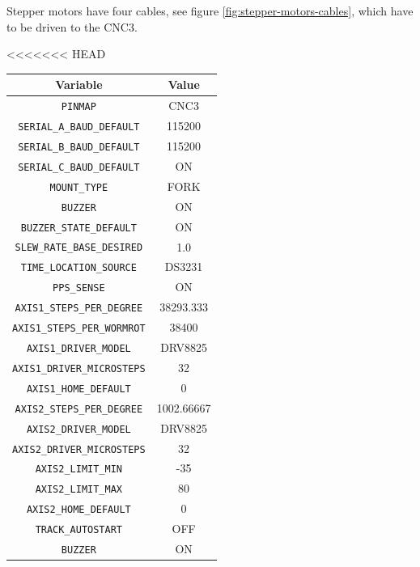 \documentclass{article}
\begin{document}
\begin{multicols}{2}
        Stepper motors have four cables, see figure \ref{fig:stepper-motors-cables}, which have to be driven to the CNC3.
        \\
        \begin{minipage}
            {0.5\textwidth}
            \centering
<<<<<<< HEAD
            \begin{tabular}{cc}
                Variable & Value \\
                \hline
                \texttt{PINMAP} & CNC3\\
                \texttt{SERIAL\_A\_BAUD\_DEFAULT} & 115200 \\
                \texttt{SERIAL\_B\_BAUD\_DEFAULT} & 115200 \\
                \texttt{SERIAL\_C\_BAUD\_DEFAULT} &  ON \\
                \texttt{MOUNT\_TYPE} & FORK \\
                \texttt{BUZZER} & ON\\
                \texttt{BUZZER\_STATE\_DEFAULT} & ON\\
                \texttt{SLEW\_RATE\_BASE\_DESIRED} & 1.0\\
                \texttt{TIME\_LOCATION\_SOURCE} & DS3231 \\
                \texttt{PPS\_SENSE} & ON \\
                \texttt{AXIS1\_STEPS\_PER\_DEGREE} & 38293.333 \\
                \texttt{AXIS1\_STEPS\_PER\_WORMROT} & 38400\\ 
                \texttt{AXIS1\_DRIVER\_MODEL} & DRV8825\\
                \texttt{AXIS1\_DRIVER\_MICROSTEPS} & 32 \\
                \texttt{AXIS1\_HOME\_DEFAULT} & 0\\
                \texttt{AXIS2\_STEPS\_PER\_DEGREE} & 1002.66667 \\
                \texttt{AXIS2\_DRIVER\_MODEL} & DRV8825 \\
                \texttt{AXIS2\_DRIVER\_MICROSTEPS} & 32 \\
                \texttt{AXIS2\_LIMIT\_MIN} & -35 \\
                \texttt{AXIS2\_LIMIT\_MAX} & 80 \\
                \texttt{AXIS2\_HOME\_DEFAULT} & 0\\
                \texttt{TRACK\_AUTOSTART} & OFF \\
                \texttt{BUZZER} & ON \\

\end{tabular}
\end{minipage}
\end{multicols}
\end{document}
